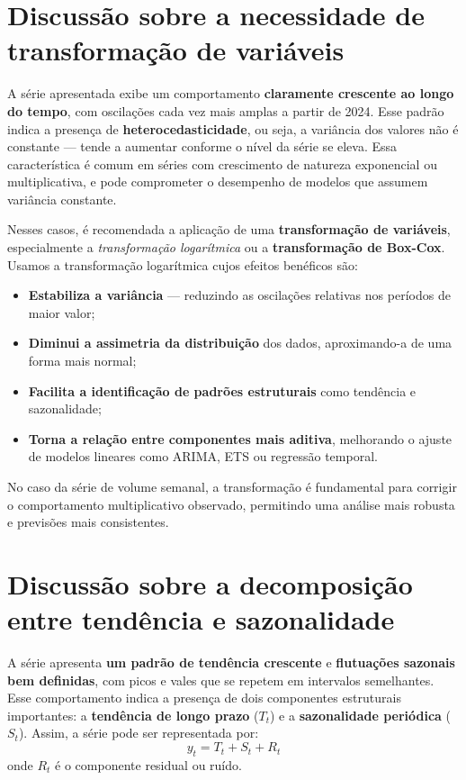 \documentclass{article}
\begin{document}
\section*{Discussão sobre a necessidade de transformação de variáveis}

A série apresentada exibe um comportamento \textbf{claramente crescente ao longo do tempo}, com oscilações cada vez mais amplas a partir de 2024. Esse padrão indica a presença de \textbf{heterocedasticidade}, ou seja, a variância dos valores não é constante — tende a aumentar conforme o nível da série se eleva. Essa característica é comum em séries com crescimento de natureza exponencial ou multiplicativa, e pode comprometer o desempenho de modelos que assumem variância constante.

Nesses casos, é recomendada a aplicação de uma \textbf{transformação de variáveis}, especialmente a \textit{transformação logarítmica} ou a \textbf{transformação de Box-Cox}.  
Usamos a transformação logarítmica cujos efeitos benéficos são:

\begin{itemize}
    \item \textbf{Estabiliza a variância} — reduzindo as oscilações relativas nos períodos de maior valor;
    \item \textbf{Diminui a assimetria da distribuição} dos dados, aproximando-a de uma forma mais normal;
    \item \textbf{Facilita a identificação de padrões estruturais} como tendência e sazonalidade;
    \item \textbf{Torna a relação entre componentes mais aditiva}, melhorando o ajuste de modelos lineares como ARIMA, ETS ou regressão temporal.
\end{itemize}

No caso da série de volume semanal, a transformação é fundamental para corrigir o comportamento multiplicativo observado, permitindo uma análise mais robusta e previsões mais consistentes.

\vspace{1em}

\section*{Discussão sobre a decomposição entre tendência e sazonalidade}

A série apresenta \textbf{um padrão de tendência crescente} e \textbf{flutuações sazonais bem definidas}, com picos e vales que se repetem em intervalos semelhantes. Esse comportamento indica a presença de dois componentes estruturais importantes: a \textbf{tendência de longo prazo} ($T_t$) e a \textbf{sazonalidade periódica} ($S_t$). Assim, a série pode ser representada por:
\[
y_t = T_t + S_t + R_t
\]
onde $R_t$ é o componente residual ou ruído.
\end{document}
